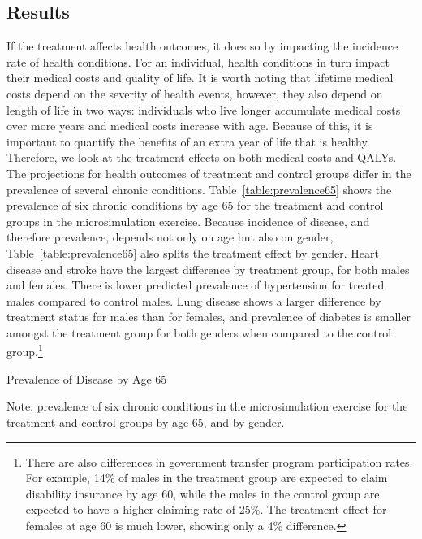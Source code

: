 \subsection{Results}

\noindent If the treatment affects health outcomes, it does so by impacting the incidence rate of health conditions. For an individual, health conditions in turn impact their medical costs and quality of life. It is worth noting that lifetime medical costs depend on the severity of health events, however, they also depend on length of life in two ways: individuals who live longer accumulate medical costs over more years and medical costs increase with age. Because of this, it is important to quantify the benefits of an extra year of life that is healthy. Therefore, we look at the treatment effects on both medical costs and QALYs. \\

\noindent The projections for health outcomes of treatment and control groups differ in the prevalence of several chronic conditions. Table~\ref{table:prevalence65} shows the prevalence of six chronic conditions by age 65 for the treatment and control groups in the microsimulation exercise. Because incidence of disease, and therefore prevalence, depends not only on age but also on gender, Table~\ref{table:prevalence65} also splits the treatment effect by gender. Heart disease and stroke have the largest difference by treatment group, for both males and females. There is lower predicted prevalence of hypertension for treated males compared to control males. Lung disease shows a larger difference by treatment status for males than for females, and prevalence of diabetes is smaller amongst the treatment group for both genders when compared to the control group.\footnote{There are also differences in government transfer program participation rates. For example, 14\% of males in the treatment group are expected to claim disability insurance by age 60, while the males in the control group are expected to have a higher claiming rate of 25\%. The treatment effect for females at age 60 is much lower, showing only a 4\% difference.} \\

\begin{table}[H]
\begin{threeparttable}
\footnotesize
\caption{Prevalence of Disease by Age 65} \label{table:prevalence65}

\begin{tablenotes}
\footnotesize
\item Note: prevalence of six chronic conditions in the microsimulation exercise for the treatment and control groups by age 65, and by gender.
\end{tablenotes}
\end{threeparttable}
\end{table}

